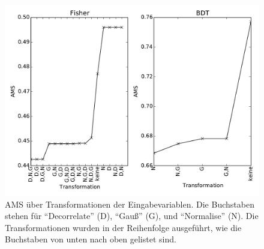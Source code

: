 \begin{figure}[htp]
\begin{center}
  \includegraphics[width=\linewidth]{sections/input_transformations/var_transform_ranking.pdf}
  \caption[AMS über Transformationen der Eingabevariablen]{AMS über Transformationen der Eingabevariablen. Die Buchstaben stehen für "`Decorrelate"' (D), "`Gauß"' (G), und "`Normalise"' (N). Die Transformationen wurden in der Reihenfolge ausgeführt, wie die Buchstaben von unten nach oben gelistet sind.}
  \label{fig:ams_over_transforamtion}
\end{center}
\end{figure}

